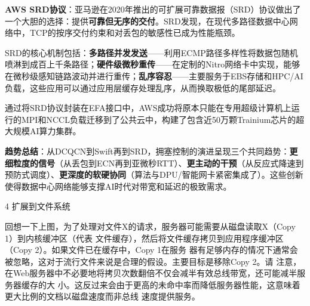 \textbf{AWS SRD协议}：亚马逊在2020年推出的可扩展可靠数据报（SRD）协议做出了一个大胆的选择：提供\textbf{可靠但无序的交付}。SRD发现，在现代多路径数据中心网络中，TCP的按序交付约束和对丢包的敏感性已成为性能瓶颈。

SRD的核心机制包括：\textbf{多路径并发发送}——利用ECMP路径多样性将数据包随机喷淋到成百上千条路径；\textbf{硬件级微秒重传}——在定制的Nitro网络卡中实现，能够在微秒级感知链路波动并进行重传；\textbf{乱序容忍}——主要服务于EBS存储和HPC/AI负载，这些应用可以通过应用层缓存处理乱序，从而换取极低的尾部延迟。

通过将SRD协议封装在EFA接口中，AWS成功将原本只能在专用超级计算机上运行的MPI和NCCL负载迁移到了公共云中，构建了包含近50万颗Trainium芯片的超大规模AI算力集群。

\textbf{趋势总结}：从DCQCN到Swift再到SRD，拥塞控制的演进呈现三个共同趋势：\textbf{更细粒度的信号}（从丢包到ECN再到亚微秒RTT）、\textbf{更主动的干预}（从反应式降速到预防式调度）、\textbf{更深度的软硬协同}（算法与DPU/智能网卡紧密集成了）。这些创新使得数据中心网络能够支撑AI时代对带宽和延迟的极致需求。

4 扩展到文件系统




回想一下上图，为了处理对文件X的请求，服务器可能需要从磁盘读取X（Copy 1）到内核缓冲区（代表
文件缓存），然后将文件缓存拷贝到应用程序缓冲区（Copy 2）。如果文件已在缓存中，Copy 1在服务
器有足够内存的情况下通常会被忽略，这对于流行文件来说是合理的假设。主要目标是移除Copy 2。请
注意，在Web服务器中不必要地将拷贝次数翻倍不仅会减半有效总线带宽，还可能减半服务器缓存的大
小。这反过来会由于更高的未命中率而降低服务器性能，这意味着更大比例的文档以磁盘速度而非总线
速度提供服务。


